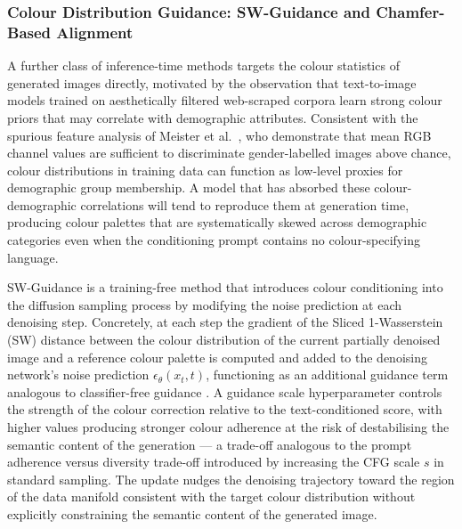 \subsubsection*{Colour Distribution Guidance: SW-Guidance and 
	Chamfer-Based Alignment}

A further class of inference-time methods targets the colour 
statistics of generated images directly, motivated by the observation 
that text-to-image models trained on aesthetically filtered 
web-scraped corpora learn strong colour priors that may correlate 
with demographic attributes. Consistent with the spurious feature 
analysis of Meister et al.\ \cite{Meister_2023_GenderArtifactsinVisualDatasets}, 
who demonstrate that mean RGB channel values are sufficient to 
discriminate gender-labelled images above chance, colour 
distributions in training data can function as low-level proxies 
for demographic group membership. A model that has absorbed these 
colour-demographic correlations will tend to reproduce them at 
generation time, producing colour palettes that are systematically 
skewed across demographic categories even when the conditioning 
prompt contains no colour-specifying language.

SW-Guidance \cite{Lobashev_2025_SWGuidance} is a training-free 
method that introduces colour conditioning into the diffusion 
sampling process by modifying the noise prediction at each 
denoising step. Concretely, at each step the gradient of the Sliced 
1-Wasserstein (SW) distance between the colour distribution of the 
current partially denoised image and a reference colour palette is 
computed and added to the denoising network's noise prediction 
$\epsilon_\theta(x_t, t)$, functioning as an additional guidance 
term analogous to classifier-free guidance \cite{Ho_2022_CFG}. A 
guidance scale hyperparameter controls the strength of the colour 
correction relative to the text-conditioned score, with higher 
values producing stronger colour adherence at the risk of 
destabilising the semantic content of the generation — a trade-off 
analogous to the prompt adherence versus diversity trade-off 
introduced by increasing the CFG scale $s$ in standard sampling. 
The update nudges the denoising trajectory toward the region of the 
data manifold consistent with the target colour distribution without 
explicitly constraining the semantic content of the generated image.

